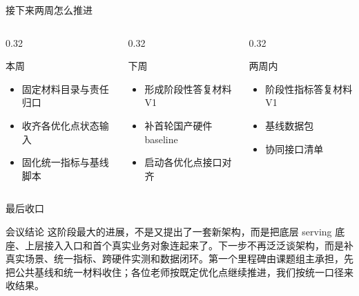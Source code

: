 \documentclass[aspectratio=169,11pt]{ctexbeamer}
\begin{document}
\begin{frame}{接下来两周怎么推进}
  \begin{columns}[T]
    \begin{column}{0.32\textwidth}
      \begin{block}{本周}
        \begin{itemize}
          \item 固定材料目录与责任归口
          \item 收齐各优化点状态输入
          \item 固化统一指标与基线脚本
        \end{itemize}
      \end{block}
    \end{column}
    \begin{column}{0.32\textwidth}
      \begin{block}{下周}
        \begin{itemize}
          \item 形成阶段性答复材料 V1
          \item 补首轮国产硬件 baseline
          \item 启动各优化点接口对齐
        \end{itemize}
      \end{block}
    \end{column}
    \begin{column}{0.32\textwidth}
      \begin{block}{两周内}
        \begin{itemize}
          \item 阶段性指标答复材料 V1
          \item 基线数据包
          \item 协同接口清单
        \end{itemize}
      \end{block}
    \end{column}
  \end{columns}
\end{frame}

\begin{frame}{最后收口}
  \begin{block}{会议结论}
    这阶段最大的进展，不是又提出了一套新架构，而是把底层 serving 底座、上层接入入口和首个真实业务对象连起来了。下一步不再泛泛谈架构，而是补真实场景、统一指标、跨硬件实测和数据闭环。第一个里程碑由课题组主承担，先把公共基线和统一材料收住；各位老师按既定优化点继续推进，我们按统一口径来收结果。
  \end{block}
\end{frame}
\end{document}
